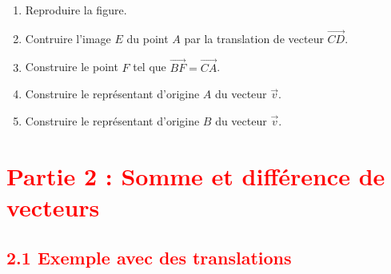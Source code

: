 \documentclass[12pt]{article}
\begin{document}
\begin{mdframed}[
    linewidth=1pt,
    roundcorner=5pt,
    linecolor=RoyalBlue,
    innertopmargin=10pt,
    innerbottommargin=10pt
]
\begin{minipage}[t]{.45\textwidth}
\begin{tikzpicture}[scale=0.8]
    \end{tikzpicture}
\end{minipage}%
\hfill
\begin{minipage}[t]{.55\textwidth}%
    \vspace{5pt}
    \begin{enumerate}
        \item Reproduire la figure.
        \item Contruire l'image $E$ du point $A$ par la translation de vecteur $\overrightarrow{CD}$.
        \item Construire le point $F$ tel que $\overrightarrow{BF} = \overrightarrow{CA}$.
        \item Construire le représentant d'origine $A$ du vecteur $\overrightarrow{v}$.
        \item Construire le représentant d'origine $B$ du vecteur $\overrightarrow{v}$.
    \end{enumerate}
\end{minipage}

\end{mdframed}

\newpage
\section*{\textcolor{red}{Partie 2 : Somme et différence de vecteurs}}

\subsection*{\textcolor{red}{2.1 Exemple avec des translations}}
\end{document}
